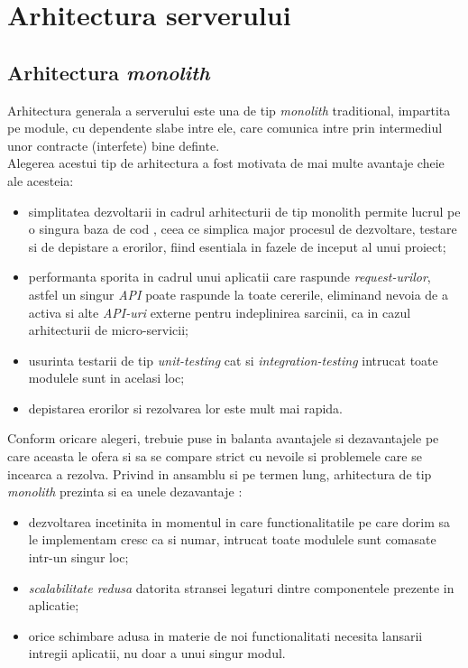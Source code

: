 \section{Arhitectura serverului}

\subsection*{Arhitectura \textit{monolith}}

Arhitectura generala a serverului este una de tip \textit{monolith} traditional, impartita pe module, cu dependente slabe intre ele, care comunica intre prin intermediul unor contracte (interfete) bine definte.\\
Alegerea acestui tip de arhitectura a fost motivata de mai multe avantaje cheie ale acesteia: 
\begin{itemize}
	\item simplitatea dezvoltarii in cadrul arhitecturii de tip monolith permite lucrul pe o singura baza de cod , ceea ce simplica major procesul de dezvoltare, testare si de depistare a erorilor, fiind esentiala in fazele de inceput al unui proiect;
	
	\item  performanta sporita in cadrul unui aplicatii care raspunde \textit{request-urilor}, astfel un singur \textit{API} poate raspunde la toate cererile, eliminand nevoia de a activa si alte \textit{API-uri} externe pentru indeplinirea sarcinii, ca in cazul arhitecturii de micro-servicii;
	
	\item usurinta testarii de tip \textit{unit-testing} cat si \textit{integration-testing} intrucat toate modulele sunt in acelasi loc;
	
	\item  depistarea erorilor si rezolvarea lor este mult mai rapida.
\end{itemize}
Conform oricare alegeri, trebuie puse in balanta avantajele si dezavantajele pe care aceasta le ofera si  sa se compare strict cu nevoile si problemele care se incearca a rezolva. Privind in ansamblu si pe termen lung, arhitectura de tip \textit{monolith} prezinta si ea unele dezavantaje : 

\begin{itemize}

 \item dezvoltarea incetinita in momentul in care functionalitatile pe care dorim sa le implementam cresc ca si numar, intrucat toate modulele sunt comasate intr-un singur loc;
 
 \item \textit{scalabilitate redusa} datorita stransei legaturi dintre componentele prezente in aplicatie;
 
 \item 	orice schimbare adusa in materie de noi functionalitati necesita lansarii intregii aplicatii, nu doar a unui singur modul.

\end{itemize}

